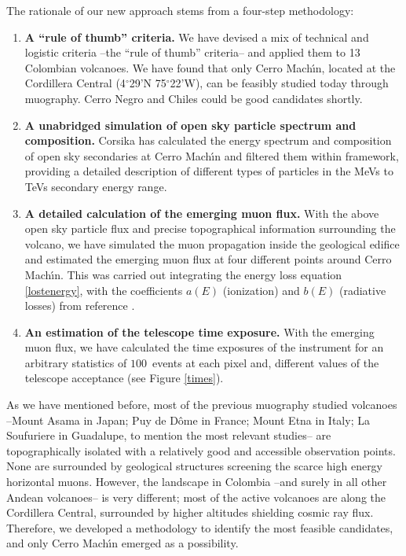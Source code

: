 \documentclass[letterpaper,10pt,titlepage,linenumber]{article}
\begin{document}
The rationale of our new approach stems from a four-step methodology:
\begin{enumerate}
\item \textbf{A ``rule of thumb'' criteria.} We have devised a mix of technical and logistic criteria --the ``rule of thumb'' criteria-- and applied them to 13 Colombian volcanoes. We have found that only Cerro Mach\'{\i}n, located at the Cordillera Central (4$^{\circ}$29'N 75$^{\circ}$22'W), can be feasibly studied today through muography. Cerro Negro and Chiles could be good candidates shortly.

\item \textbf{A unabridged simulation of open sky particle spectrum and composition.} {\sc Corsika} has calculated the energy spectrum and composition of open sky secondaries at Cerro Mach\'{\i}n and filtered them within {} framework, providing a detailed description of different types of particles in the MeVs to TeVs secondary energy range\cite{AsoreyEtal2015B,SuarezENG2015}.

\item \textbf{A detailed calculation of the emerging muon flux.} With the above open sky particle flux and precise topographical information surrounding the volcano, we have simulated the muon propagation inside the geological edifice and estimated the emerging muon flux at four different points around Cerro Mach\'{\i}n. This was carried out integrating the energy loss equation \ref{lostenergy}, with the coefficients $a(E)$ (ionization) and $b(E)$ (radiative losses) from reference \cite{OliveEtal2014}.

\item \textbf{An estimation of the telescope time exposure.} With the emerging muon flux, we have calculated the time exposures of the instrument for an arbitrary statistics of $100$\, events at each pixel and, different values of the telescope acceptance (see Figure \ref{times}).  
\end{enumerate}

As we have mentioned before, most of the previous muography studied volcanoes --Mount Asama \cite{TanakaEtal2007} in Japan; Puy de D\^ome \cite{NoliEtal2017} in France; Mount Etna \cite{CarboneEtal2014} in Italy; La Soufuriere\cite{LesparreEtal2012,LesparreEtal2012B} in Guadalupe, to mention the most relevant studies-- are topographically isolated with a relatively good and accessible observation points. None are surrounded by geological structures screening the scarce high energy horizontal muons. However, the landscape in Colombia --and surely in all other Andean volcanoes-- is very different; most of the active volcanoes are along the Cordillera Central, surrounded by higher altitudes shielding cosmic ray flux. Therefore, we developed a methodology to identify the most feasible candidates, and only Cerro Mach\'{\i}n emerged as a possibility.    
\end{document}
